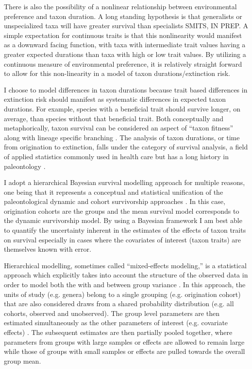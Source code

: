 \documentclass[12pt,letterpaper]{article}
\begin{document}
There is also the possibility of a nonlinear relationship between environmental preference and taxon duration. A long standing hypothesis is that generalists or unspecialized taxa will have greater survival than specialists \citep{Simpson1944,Liow2004a,Nurnberg2013a,Nurnberg2015,Baumiller1993} \uppercase{Smits, in prep}. A simple expectation for continuous traits is that this nonlinearity would manifest as a downward facing function, with taxa with intermediate trait values having a greater expected durations than taxa with high or low trait values. By utilizing a continuous measure of environmental preference, it is relatively straight forward to allow for this non-linearity in a model of taxon durations/extinction risk.

I choose to model differences in taxon durations because trait based differences in extinction risk should manifest as systematic differences in expected taxon durations. For example, species with a beneficial trait should survive longer, on average, than species without that beneficial trait. Both conceptually and metaphorically, taxon survival can be considered an aspect of ``taxon fitness'' along with lineage specific branching \citep{Cooper1984,Palmer2012}. The analysis of taxon durations, or time from origination to extinction, falls under the category of survival analysis, a field of applied statistics commonly used in health care \citep{Klein2003} but has a long history in paleontology \citep{Simpson1944,Simpson1953,VanValen1973,VanValen1979}.

I adopt a hierarchical Bayesian survival modelling approach for multiple reasons, one being that it represents a conceptual and statistical unification of the paleontological dynamic and cohort survivorship approaches \citep{VanValen1973,VanValen1979,Raup1978,Raup1975,Foote1988,Baumiller1993,Simpson2006}. In this case, origination cohorts are the groups and the mean survival model corresponds to the dynamic survivorship model. By using a Bayesian framework I am best able to quantify the uncertainty inherent in the estimates of the effects of taxon traits on survival especially in cases where the covariates of interest (taxon traits) are themselves known with error.

Hierarchical modelling, sometimes called ``mixed-effects modeling,'' is a statistical approach which explicitly takes into account the structure of the observed data in order to model both the with and between group variance \citep{Gelman2013d,Gelman2007}. In this approach, the units of study (e.g. genera) belong to a single grouping (e.g. origination cohort) that are also considered draws from a shared probability distribution (e.g. all cohorts, observed and unobserved). The group level parameters are then estimated simultaneously as the other parameters of interest (e.g. covariate effects) \citep{Gelman2013d}. The subsequent estimates are then partially pooled together, where parameters from groups with large samples or effects are allowed to remain large while those of groups with small samples or effects are pulled towards the overall group mean.
\end{document}
